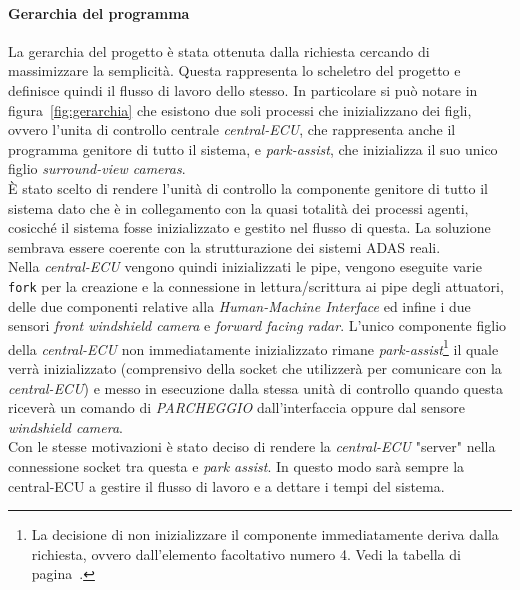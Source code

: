\documentclass[11pt, openany]{article}
\theoremstyle{definition}
\theoremstyle{plain}
\theoremstyle{remark}
\begin{document}
		\paragraph{Gerarchia del programma}
			La gerarchia del progetto è stata ottenuta dalla richiesta cercando di massimizzare la semplicità.
			Questa rappresenta lo scheletro del progetto e definisce quindi il flusso di lavoro dello stesso. In particolare si può notare in figura~\ref{fig:gerarchia} che esistono due soli processi che inizializzano dei figli, ovvero l'unita di controllo centrale \textit{central-ECU}, che rappresenta anche il programma genitore di tutto il sistema, e \textit{park-assist}, che inizializza il suo unico figlio \textit{surround-view cameras}.\\
			È stato scelto di rendere l'unità di controllo la componente genitore di tutto il sistema dato che è in collegamento con la quasi totalità dei processi agenti, cosicché il sistema fosse inizializzato e gestito nel flusso di questa. La soluzione sembrava essere coerente con la strutturazione dei sistemi ADAS reali.\\
			Nella \textit{central-ECU} vengono quindi inizializzati le pipe, vengono eseguite varie \texttt{fork} per la creazione e la connessione in lettura/scrittura ai pipe degli attuatori, delle due componenti relative alla \textit{Human-Machine Interface} ed infine i due sensori \textit{front windshield camera} e \textit{forward facing radar}. L'unico componente figlio della \textit{central-ECU} non immediatamente inizializzato rimane \textit{park-assist}\footnote{La decisione di non inizializzare il componente immediatamente deriva dalla richiesta, ovvero dall'elemento facoltativo numero 4. Vedi la tabella di pagina~\pageref{tab:facoltativi}.} il quale verrà inizializzato (comprensivo della socket che utilizzerà per comunicare con la \textit{central-ECU}) e messo in esecuzione dalla stessa unità di controllo quando questa riceverà un comando di \textit{PARCHEGGIO} dall'interfaccia oppure dal sensore \textit{windshield camera}.\\
			Con le stesse motivazioni è stato deciso di rendere la \textit{central-ECU} "server" nella connessione socket tra questa e \textit{park assist}. In questo modo sarà sempre la central-ECU a gestire il flusso di lavoro e a dettare i tempi del sistema.
\end{document}
